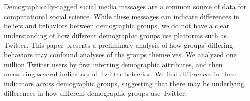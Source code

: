 Demographically-tagged social media messages are a common source of data for computational social science.  While these messages can indicate differences in beliefs and behaviors between demographic groups, we do not have a clear understanding of how different demographic groups use platforms such as Twitter.  This paper presents a preliminary analysis of how groups' differing behaviors may confound analyses of the groups themselves.  We analyzed one million Twitter users by first inferring demographic attributes, and then measuring several indicators of Twitter behavior. We find differences in these indicators across demographic groups, suggesting that there may be underlying differences in how different demographic groups use Twitter.
